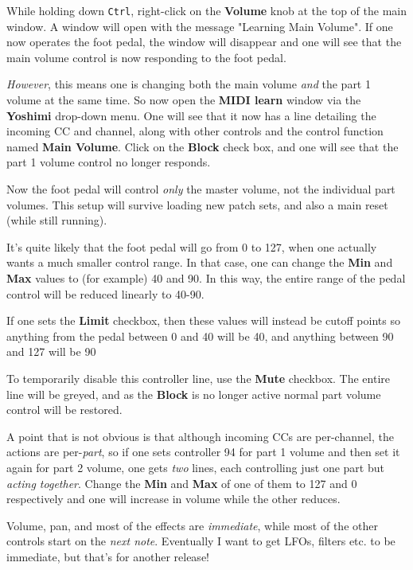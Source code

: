    While holding down \texttt{Ctrl}, right-click on the
   \textbf{Volume} knob at the top of the
   main window. A window will open with the message "Learning Main Volume".
   If one now operates the foot pedal, the window will disappear and one will
   see that the main volume control is now responding to the foot pedal.

   \textsl{However}, this means one is changing both the main volume
   \textsl{and} the part 1 volume at the same time.  So now open the
   \textbf{MIDI learn} window via the \textbf{Yoshimi} drop-down menu. One will
   see that it now has a line detailing the incoming CC and channel, along with
   other controls and the control function named \textbf{Main Volume}.  Click
   on the \textbf{Block} check box, and one will see that the part 1 volume
   control no longer responds.

   Now the foot pedal will control \textsl{only} the master volume, not the
   individual part volumes. This setup will survive loading new patch sets, and
   also a main reset (while still running).

   It's quite likely that the foot pedal will go from 0 to 127, when one actually
   wants a much smaller control range.  In that case, one can change the
   \textbf{Min} and \textbf{Max}
   values to (for example) 40 and 90.
   In this way, the entire range of the pedal control will be reduced linearly to
   40-90.

   If one sets the \textbf{Limit} checkbox, then these values will instead be
   cutoff points so anything from the pedal between 0 and 40 will be 40, and
   anything between 90 and 127 will be 90

   To temporarily disable this controller line, use the \textbf{Mute} checkbox.
   The entire line will be greyed, and as the \textbf{Block} is no longer
   active normal part volume control will be restored.

   A point that is not obvious is that although incoming CCs are per-channel,
   the actions are per-\textsl{part}, so if one sets controller 94 for part 1
   volume and then set it again for part 2 volume, one gets \textsl{two} lines,
   each controlling just one part but \textsl{acting together}.  Change the
   \textbf{Min} and \textbf{Max} of one of them to 127 and 0 respectively and
   one will increase in volume while the other reduces.

   Volume, pan, and most of the effects are \textsl{immediate}, while most of
   the other controls start on the \textsl{next note}.  Eventually I want to
   get LFOs, filters etc. to be immediate, but that's for another release!

